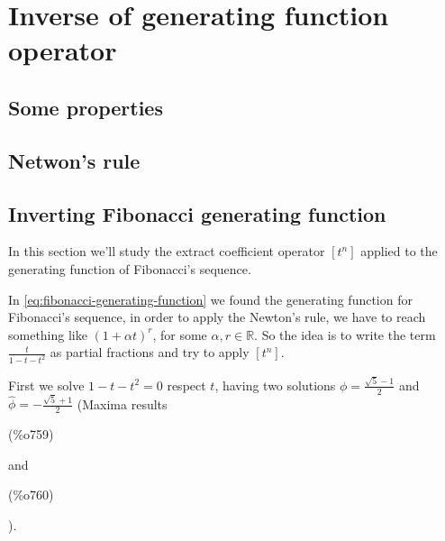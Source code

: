 
\section{Inverse of generating function operator}

\subsection{Some properties}

\subsection{Netwon's rule}

\subsection{Inverting Fibonacci generating function}
In this section we'll study the extract coefficient operator $[t^{n}]$
applied to the generating function of Fibonacci's sequence.

In \autoref{eq:fibonacci-generating-function} we found the generating
function for Fibonacci's sequence, in order to apply the Newton's
rule, we have to reach something like $(1 + \alpha t)^r$, for some
$\alpha, r \in \mathbb{R} $. So the idea is to write the term
$\frac{t}{1-t-t^2}$ as partial fractions and try to apply $[t^{n}]$.

First we solve $1-t-t^2 = 0$ respect $t$, having two solutions
$\phi=\frac{\sqrt{5}-1}{2}$ and $\hat{\phi}=-\frac{\sqrt{5}+1}{2}$
(Maxima results \parbox{8ex}{\color{labelcolor}(\%o759) }
and \parbox{8ex}{\color{labelcolor}(\%o760) }).

